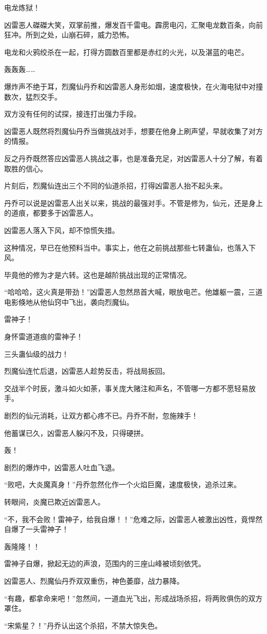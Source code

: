 \begin{this_body}
电龙炼狱！

凶雷恶人磔磔大笑，双掌前推，爆发百千雷电。霹雳电闪，汇聚电龙数百条，向前狂冲。所到之处，山崩石碎，威力恐怖。

电龙和火鸦绞杀在一起，打得方圆数百里都是赤红的火光，以及湛蓝的电芒。

轰轰轰……

爆炸声不绝于耳，烈魔仙丹乔和凶雷恶人身形如烟，速度极快，在火海电狱中对撞数次，猛烈交手。

双方没有任何的试探，接连打出强力手段。

凶雷恶人既然将烈魔仙丹乔当做挑战对手，想要在他身上刷声望，早就收集了对方的情报。

反之丹乔既然答应凶雷恶人挑战之事，也是准备充足，对凶雷恶人十分了解，有着取胜的信心。

片刻后，烈魔仙连出三个不同的仙道杀招，打得凶雷恶人抬不起头来。

丹乔可以说是凶雷恶人出关以来，挑战的最强对手。不管是修为，仙元，还是身上的道痕，都要多于凶雷恶人。

凶雷恶人落入下风，却不惊慌失措。

这种情况，早已在他预料当中。事实上，他在之前挑战那些七转蛊仙，也落入下风。

毕竟他的修为才是六转。这也是越阶挑战出现的正常情况。

“哈哈哈，这火真是带劲！”凶雷恶人忽然昂首大喊，眼放电芒。他雄躯一震，三道电影倏地从他仙窍中飞出，袭向烈魔仙。

雷神子！

身怀雷道道痕的雷神子！

三头蛊仙级的战力！

烈魔仙连忙后退，凶雷恶人趁势反击，将战局扳回。

交战半个时辰，激斗如火如荼，事关庞大赌注和声名，不管哪一方都不愿轻易放手。

剧烈的仙元消耗，让双方都心疼不已。丹乔不耐，忽施辣手！

他蓄谋已久，凶雷恶人躲闪不及，只得硬拼。

轰！

剧烈的爆炸中，凶雷恶人吐血飞退。

“败吧，大炎魔真身！”丹乔忽然化作一个火焰巨魔，速度极快，追杀过来。

转眼间，炎魔已欺近凶雷恶人。

“不，我不会败！雷神子，给我自爆！！”危难之际，凶雷恶人被激出凶性，竟悍然自爆了一头雷神子！

轰隆隆！！

雷神子自爆，掀起无边的声浪，范围内的三座山峰被顷刻依凭。

凶雷恶人、烈魔仙丹乔双双重伤，神色萎靡，战力暴降。

“有趣，都拿命来吧！”忽然间，一道血光飞出，形成战场杀招，将两败俱伤的双方罩住。

“宋紫星？！”丹乔认出这个杀招，不禁大惊失色。

\end{this_body}

